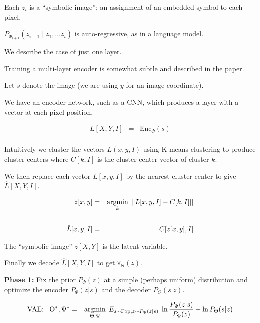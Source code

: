 {{\vfill
Each $z_i$ is a ``symbolic image'': an assignment of an embedded symbol to each pixel.

\vfill
$P_{\Phi_{i+1}}(z_{i+1}\;|\; z_1,\ldots z_i)$ is auto-regressive, as in a language model.

}


We describe the case of just one layer.

\vfill
Training a multi-layer encoder is somewhat subtle and described in the paper.


Let $s$ denote the image (we are using $y$ for an image coordinate).

\vfill
We have an encoder network, such as a CNN, which produces a layer with a vector at each pixel position.

\begin{eqnarray*}
L[X,Y,I] & = & \mathrm{Enc}_\Phi(s) \\
\end{eqnarray*}

Intuitively we cluster the vectors $L(x,y,I)$ using K-means clustering to produce cluster centers where $C[k,I]$
is the cluster center vector of cluster $k$.


We then replace each vector $L[x,y,I]$ by the nearest cluster center to give $\hat{L}[X,Y,I]$.

{\huge
\begin{eqnarray*}
z[x,y] & = & \operatorname*{argmin}_k \;||L[x,y,I] - C[k,I]|| \\
\\
\hat{L}[x,y,I] & = & C[z[x,y],I] \\
\end{eqnarray*}
}

The ``symbolic image'' $z[X,Y]$ is the latent variable.


Finally we decode $\hat{L}[X,Y,I]$ to get $\hat{s}_\Theta(z)$.


{\huge
{\bf Phase 1:} Fix the prior $P_\Phi(z)$ at a simple (perhaps uniform) distribution and optimize the encoder $P_\Psi(z|s)$ and the decoder $P_\Theta(s|z)$.

\begin{eqnarray*}
\mbox{VAE:}\;\;\;\Theta^*,\Psi^* &  = & \operatorname*{argmin}_{\Theta,\Psi}\;E_{s\sim \mathrm{Pop},z\sim P_\Psi(z|s)}  \;\ln \frac{P_\Psi(z|s)}{P_\Phi(z)}  - \ln P_\Theta(s|z)
\end{eqnarray*}

}}
